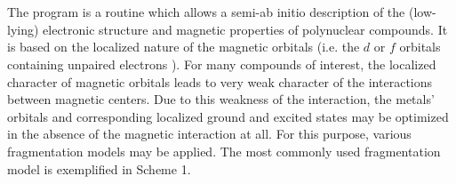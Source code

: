 \section{}

\label{UG:sec:poly_aniso}


The  program is a routine which allows a semi-ab initio
description of the (low-lying) electronic structure and magnetic properties
of polynuclear compounds. It is based on the localized nature of the magnetic
orbitals (i.e. the $d$ or $f$ orbitals containing unpaired electrons \cite{Anderson1959,Anderson1963}).
For many compounds of interest, the localized character of magnetic orbitals leads
to very weak character of the interactions between magnetic centers. Due to this weakness of the
interaction, the metals' orbitals and corresponding localized ground and excited states
may be optimized in the absence of the magnetic interaction at all. For this purpose, various fragmentation
models may be applied. The most commonly used fragmentation model is exemplified in Scheme 1.



